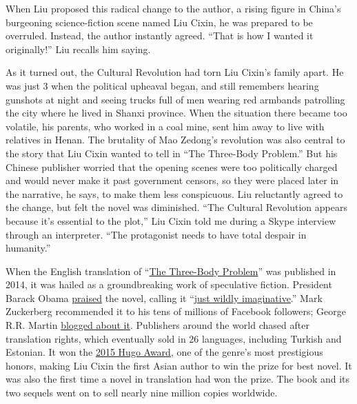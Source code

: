 When Liu proposed this radical change to the author, a rising figure in
China's burgeoning science-fiction scene named Liu Cixin, he was
prepared to be overruled. Instead, the author instantly agreed. ``That
is how I wanted it originally!'' Liu recalls him saying.

As it turned out, the Cultural Revolution had torn Liu Cixin's family
apart. He was just 3 when the political upheaval began, and still
remembers hearing gunshots at night and seeing trucks full of men
wearing red armbands patrolling the city where he lived in Shanxi
province. When the situation there became too volatile, his parents, who
worked in a coal mine, sent him away to live with relatives in Henan.
The brutality of Mao Zedong's revolution was also central to the story
that Liu Cixin wanted to tell in ``The Three-Body Problem.'' But his
Chinese publisher worried that the opening scenes were too politically
charged and would never make it past government censors, so they were
placed later in the narrative, he says, to make them less conspicuous.
Liu reluctantly agreed to the change, but felt the novel was diminished.
``The Cultural Revolution appears because it's essential to the plot,''
Liu Cixin told me during a Skype interview through an interpreter. ``The
protagonist needs to have total despair in humanity.''

When the English translation of
``\href{https://www.nytimes3xbfgragh.onion/2014/11/11/books/liu-cixins-the-three-body-problem-is-published-in-us.html}{The
Three-Body Problem}'' was published in 2014, it was hailed as a
groundbreaking work of speculative fiction. President Barack Obama
\href{https://www.nytimes3xbfgragh.onion/2017/01/16/books/obamas-secret-to-surviving-the-white-house-years-books.html}{praised}
the novel, calling it
``\href{https://www.nytimes3xbfgragh.onion/2017/01/18/books/president-obamas-reading-list.html}{just
wildly imaginative}.'' Mark Zuckerberg recommended it to his tens of
millions of Facebook followers; George R.R. Martin
\href{https://grrm.livejournal.com/426205.html}{blogged about it}.
Publishers around the world chased after translation rights, which
eventually sold in 26 languages, including Turkish and Estonian. It won
the
\href{https://sinosphere.blogs.nytimes3xbfgragh.onion/2015/08/24/science-fiction-prize-is-awarded-to-chinese-writer-for-first-time}{2015
Hugo Award}, one of the genre's most prestigious honors, making Liu
Cixin the first Asian author to win the prize for best novel. It was
also the first time a novel in translation had won the prize. The book
and its two sequels went on to sell nearly nine million copies
worldwide.

